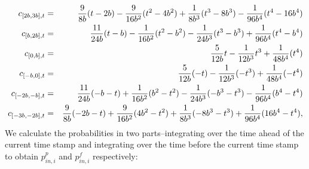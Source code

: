 \begin{eqnarray}
c_{[2b, 3b],t} &=&      {9 \over 8 b}(t-2b)-{9 \over 16 b^2}(t^2-4b^2)+{1\over8 b^3}(t^3-8b^3)-{1\over 96b^4}(t^4-16b^4)\label{eqn:cdfcomp}\\
c_{[b,2b],t} &=&      {11\over 24b}(t-b)-{1\over 16b^2}(t^2-b^2)-{1\over 24b^3}(t^3-b^3)+{1\over 96b^4}(t^4-b^4)\nonumber\\
c_{[0,b],t} &=& {5\over 12b}t-{1\over 12b^3}t^3+{1\over 48 b^4}(t^4)\nonumber \\
c_{[-b,0],t} &=& {5\over 12b}(-t)-{1\over 12b^3}(-t^3)+{1\over 48 b^4}(-t^4)\nonumber \\
c_{[-2b,-b],t} &=&      {11\over 24b}(-b-t)+{1\over 16b^2}(b^2-t^2)-{1\over 24b^3}(-b^3-t^3)-{1\over 96b^4}(b^4-t^4)\nonumber\\
c_{[-3b, -2b],t} &=&      {9 \over 8 b}(-2b-t)+{9 \over 16 b^2}(4b^2-t^2)+{1\over8 b^3}(-8b^3-t^3)+{1\over 96b^4}(16b^4-t^4)\nonumber,
\end{eqnarray}
We calculate the probabilities in two parts--integrating over the time ahead of the current time stamp and integrating over the time before the current time stamp to obtain $p_{in,i}^p$ and $p_{in,i}^f$ respectively:
